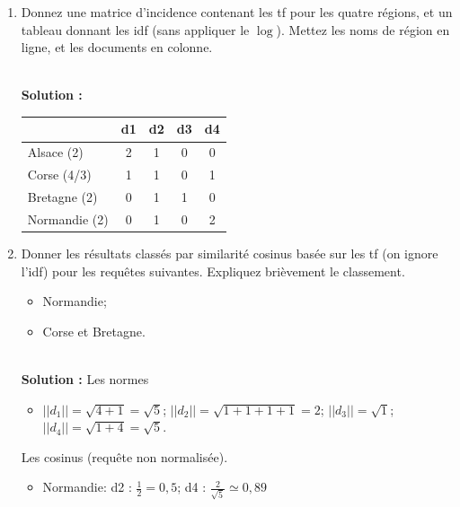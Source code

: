 \documentclass[11pt,a4paper]{article}
\newenvironment{solution}[0]{
~\\ \color{red} \textbf{Solution : }\color{black}}{%
}
\begin{document}
\begin{enumerate}
   \item Donnez une matrice d'incidence contenant les tf pour les quatre régions,
      et un tableau donnant les idf (sans appliquer le $\log$). Mettez les noms de région
      en ligne, et les documents en colonne.

\begin{solution}
\begin{center}
\begin{tabular}{l|c|c|c|c}
            & \textbf{d1} & \textbf{d2} & \textbf{d3} &\textbf{d4} \\ \hline  
   Alsace  (2)   & 2          & 1           & 0           & 0        \\
   Corse    (4/3)  & 1           & 1           & 0          & 1         \\
   Bretagne    (2)  & 0           & 1          & 1           & 0         \\
   Normandie    (2)  & 0           & 1           & 0          & 2         \\ \hline
   \end{tabular}
\end{center}
\end{solution}

  \item Donner les résultats classés par similarité cosinus basée sur les tf 
  (on ignore l'idf) pour les requêtes suivantes. Expliquez brièvement le classement.
  
  \begin{itemize}
    \item Normandie;
    \item Corse et Bretagne.
  \end{itemize}
\begin{solution}
Les normes
\begin{itemize}
  \item $||d_1|| = \sqrt{4+ 1} = \sqrt{5}$; $||d_2|| = \sqrt{1+1+1+1} = 2$; 
     $||d_3|| = \sqrt{1}$; 
    $||d_4|| = \sqrt{1+4}=\sqrt{5}$.
\end{itemize}

Les cosinus (requête non normalisée).

\begin{itemize}
  \item Normandie: d2 : $\frac{1}{2}=0,5$;  
       d4 : $\frac{2}{\sqrt{5}} \simeq 0,89$ 
       

\end{itemize}
\end{solution}
\end{enumerate}
\end{document}
